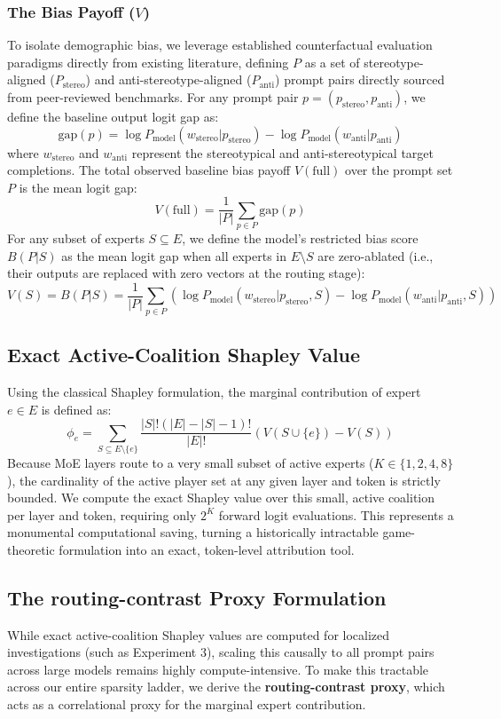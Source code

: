\documentclass[11pt,a4paper]{article}
\begin{document}
\subsubsection{The Bias Payoff ($V$)}
To isolate demographic bias, we leverage established counterfactual evaluation paradigms directly from existing literature, defining $P$ as a set of stereotype-aligned ($P_{\text{stereo}}$) and anti-stereotype-aligned ($P_{\text{anti}}$) prompt pairs directly sourced from peer-reviewed benchmarks. For any prompt pair $p = (p_{\text{stereo}}, p_{\text{anti}})$, we define the baseline output logit gap as:
$$\text{gap}(p) = \log P_{\text{model}}(w_{\text{stereo}} | p_{\text{stereo}}) - \log P_{\text{model}}(w_{\text{anti}} | p_{\text{anti}})$$
where $w_{\text{stereo}}$ and $w_{\text{anti}}$ represent the stereotypical and anti-stereotypical target completions. The total observed baseline bias payoff $V(\text{full})$ over the prompt set $P$ is the mean logit gap:
$$V(\text{full}) = \frac{1}{|P|} \sum_{p \in P} \text{gap}(p)$$
For any subset of experts $S \subseteq E$, we define the model's restricted bias score $B(P | S)$ as the mean logit gap when all experts in $E \setminus S$ are zero-ablated (i.e., their outputs are replaced with zero vectors at the routing stage):
$$V(S) = B(P | S) = \frac{1}{|P|} \sum_{p \in P} \left( \log P_{\text{model}}(w_{\text{stereo}} | p_{\text{stereo}}, S) - \log P_{\text{model}}(w_{\text{anti}} | p_{\text{anti}}, S) \right)$$

\subsection{Exact Active-Coalition Shapley Value}
Using the classical Shapley formulation, the marginal contribution of expert $e \in E$ is defined as:
$$\phi_e = \sum_{S \subseteq E \setminus \{e\}} \frac{|S|! (|E| - |S| - 1)!}{|E|!} \left( V(S \cup \{e\}) - V(S) \right)$$
Because MoE layers route to a very small subset of active experts ($K \in \{1, 2, 4, 8\}$), the cardinality of the active player set at any given layer and token is strictly bounded. We compute the exact Shapley value over this small, active coalition per layer and token, requiring only $2^K$ forward logit evaluations. This represents a monumental computational saving, turning a historically intractable game-theoretic formulation into an exact, token-level attribution tool.

\subsection{The routing-contrast Proxy Formulation}
While exact active-coalition Shapley values are computed for localized investigations (such as Experiment 3), scaling this causally to all prompt pairs across large models remains highly compute-intensive. To make this tractable across our entire sparsity ladder, we derive the \textbf{routing-contrast proxy}, which acts as a correlational proxy for the marginal expert contribution. 
\end{document}
